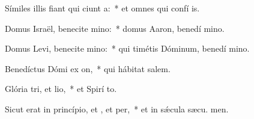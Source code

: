 \item Símiles illis fiant qui ciunt a:~* et omnes qui confí  is.
\item Domus Israël, benecite mino:~* domus Aaron, benedí mino.
\item Domus Levi, benecite mino:~* qui timétis Dóminum, benedí mino.
\item Benedíctus Dómi ex on,~* qui hábitat  salem.
\item Glória tri, et lio,~* et Spirí to.
\item Sicut erat in princípio, et , et per,~* et in sǽcula sæcu. men.
